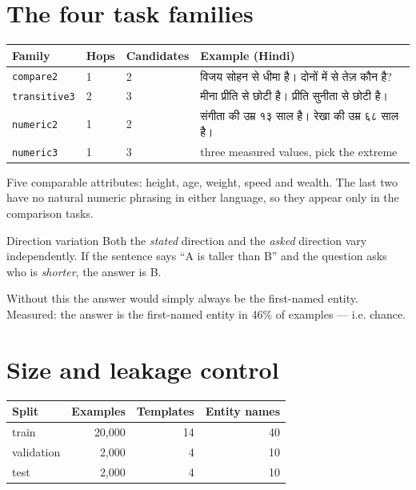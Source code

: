 \documentclass[11pt]{report}
\newcommand{\dn}[1]{{\devanagarifont #1}}
\newcommand{\p}[1]{\texttt{#1}}
\begin{document}
\section{The four task families}

\begin{center}
\begin{tabular}{@{}llll@{}}
\toprule
\textbf{Family} & \textbf{Hops} & \textbf{Candidates} & \textbf{Example (Hindi)} \\
\midrule
\p{compare2} & 1 & 2 & \dn{विजय सोहन से धीमा है। दोनों में से तेज़ कौन है?} \\
\p{transitive3} & 2 & 3 & \dn{मीना प्रीति से छोटी है। प्रीति सुनीता से छोटी है।} \\
\p{numeric2} & 1 & 2 & \dn{संगीता की उम्र १३ साल है। रेखा की उम्र ६८ साल है।} \\
\p{numeric3} & 1 & 3 & three measured values, pick the extreme \\
\bottomrule
\end{tabular}
\end{center}

Five comparable attributes: height, age, weight, speed and wealth. The last two
have no natural numeric phrasing in either language, so they appear only in the
comparison tasks.

\begin{implementation}{Direction variation}
Both the \emph{stated} direction and the \emph{asked} direction vary
independently. If the sentence says ``A is taller than B'' and the question asks
who is \emph{shorter}, the answer is B.

Without this the answer would simply always be the first-named entity. Measured:
the answer is the first-named entity in 46\% of examples --- i.e. chance.
\end{implementation}

\section{Size and leakage control}

\begin{center}
\begin{tabular}{@{}lrrr@{}}
\toprule
\textbf{Split} & \textbf{Examples} & \textbf{Templates} & \textbf{Entity names} \\
\midrule
train & 20,000 & 14 & 40 \\
validation & 2,000 & 4 & 10 \\
test & 2,000 & 4 & 10 \\
\bottomrule
\end{tabular}
\end{center}
\end{document}
